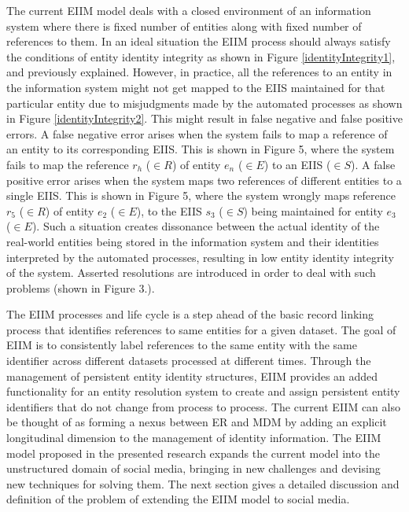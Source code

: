 The current EIIM model deals with a closed environment of an information system where there is fixed number of entities along with fixed number of references to them. In an ideal situation the EIIM process should always satisfy the conditions of entity identity integrity as shown in Figure \ref{identityIntegrity1}, and previously explained. However, in practice, all the references to an entity in the information system might not get mapped to the EIIS maintained for that particular entity due to misjudgments made by the automated processes as shown in Figure \ref{identityIntegrity2}. This might result in false negative and false positive errors. A false negative error arises when the system fails to map a reference of an entity to its corresponding EIIS. This is shown in Figure 5, where the system fails to map the reference $r_{h}$ ($\in R$) of entity $e_{n}$ ($\in E$) to an EIIS ($\in S$). A false positive error arises when the system maps two references of different entities to a single EIIS. This is shown in Figure 5, where the system wrongly maps reference $r_{5}$ ($\in R$) of entity $e_{2}$ ($\in E$), to the EIIS $s_{3}$ ($\in S$) being maintained for entity $e_{3}$ ($\in E$). Such a situation creates dissonance between the actual identity of the real-world entities being stored in the information system and their identities interpreted by the automated processes, resulting in low entity identity integrity of the system. Asserted resolutions are introduced in order to deal with such problems (shown in Figure 3.).

The EIIM processes and life cycle is a step ahead of the basic record linking process that identifies references to same entities for a given dataset. The goal of EIIM is to consistently label references to the same entity with the same identifier across different datasets processed at different times. Through the management of persistent entity identity structures, EIIM provides an added functionality for an entity resolution system to create and assign persistent entity identifiers that do not change from process to process. The current EIIM can also be thought of as forming a nexus between ER and MDM by adding an explicit longitudinal dimension to the management of identity information. The EIIM model proposed in the presented research expands the current model into the unstructured domain of social media, bringing in new challenges and devising new techniques for solving them. The next section gives a detailed discussion and definition of the problem of extending the EIIM model to social media.

